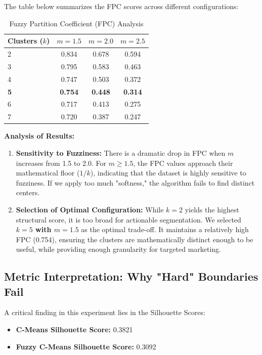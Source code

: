 \documentclass[12pt, a4paper]{article}
\begin{document}
The table below summarizes the FPC scores across different configurations:

\begin{table}[H]
\centering
\caption{Fuzzy Partition Coefficient (FPC) Analysis}
\label{tab:fpc_analysis}
\begin{tabular}{lccc}
\toprule
\textbf{Clusters ($k$)} & \textbf{$m=1.5$} & \textbf{$m=2.0$} & \textbf{$m=2.5$} \\
\midrule
2 & 0.834 & 0.678 & 0.594 \\
3 & 0.795 & 0.583 & 0.463 \\
4 & 0.747 & 0.503 & 0.372 \\
\textbf{5} & \textbf{0.754} & \textbf{0.448} & \textbf{0.314} \\
6 & 0.717 & 0.413 & 0.275 \\
7 & 0.720 & 0.387 & 0.247 \\
\bottomrule
\end{tabular}
\end{table}

\noindent \textbf{Analysis of Results:}
\begin{enumerate}
    \item \textbf{Sensitivity to Fuzziness:} There is a dramatic drop in FPC when $m$ increases from 1.5 to 2.0. For $m \geq 1.5$, the FPC values approach their mathematical floor ($1/k$), indicating that the dataset is highly sensitive to fuzziness. If we apply too much "softness," the algorithm fails to find distinct centers.
    \item \textbf{Selection of Optimal Configuration:} While $k=2$ yields the highest structural score, it is too broad for actionable segmentation. We selected \textbf{$k=5$ with $m=1.5$} as the optimal trade-off. It maintains a relatively high FPC (0.754), ensuring the clusters are mathematically distinct enough to be useful, while providing enough granularity for targeted marketing.
\end{enumerate}

\subsection{Metric Interpretation: Why "Hard" Boundaries Fail}
A critical finding in this experiment lies in the Silhouette Scores:
\begin{itemize}
    \item \textbf{C-Means Silhouette Score:} 0.3821
    \item \textbf{Fuzzy C-Means Silhouette Score:} 0.3092
\end{itemize}
\end{document}

